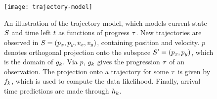 \begin{figure}
  \centering
  \texttt{[image: trajectory-model]}
  \caption{An illustration of the trajectory model, which models
    current state $S$ and time left $t$ as functions of
    progress $\tau$. New trajectories are observed in 
    $S = (p_x, p_y, v_x, v_y)$, containing position and velocity. 
    $p$ denotes orthogonal projection onto the subspace $S' = (p_x,
    p_y)$, which is the domain of $g_{k}$. Via $p$,
    $g_{k}$ gives the progression $\tau$ of an
    observation. The projection onto a trajectory for some $\tau$ is given
    by $f_{k}$, which is used to compute the data
    likelihood. Finally, arrival time predictions are made through $h_{k}$.}\label{fig:trajectory-model}
\end{figure}



